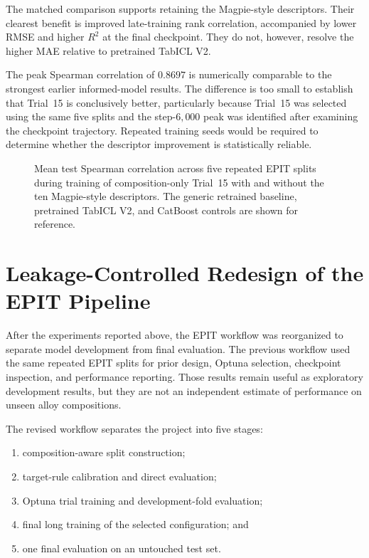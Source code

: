 \documentclass{article}
\begin{document}
The matched comparison supports retaining the Magpie-style descriptors. Their
clearest benefit is improved late-training rank correlation, accompanied by
lower RMSE and higher \(R^2\) at the final checkpoint. They do not, however,
resolve the higher MAE relative to pretrained TabICL V2.

The peak Spearman correlation of \(0.8697\) is numerically comparable to the
strongest earlier informed-model results. The difference is too small to
establish that Trial~15 is conclusively better, particularly because Trial~15
was selected using the same five splits and the step-\(6{,}000\) peak was
identified after examining the checkpoint trajectory. Repeated training seeds
would be required to determine whether the descriptor improvement is
statistically reliable.

\begin{figure}[htbp]
    \centering
    
    \caption{Mean test Spearman correlation across five repeated EPIT splits
    during training of composition-only Trial~15 with and without the ten
    Magpie-style descriptors. The generic retrained baseline, pretrained
    TabICL V2, and CatBoost controls are shown for reference.}
    \label{fig:magpie-trial15-spearman}
\end{figure}

\section{Leakage-Controlled Redesign of the EPIT Pipeline}
\label{sec:epit-pipeline-redesign}

After the experiments reported above, the EPIT workflow was reorganized to
separate model development from final evaluation. The previous workflow used
the same repeated EPIT splits for prior design, Optuna selection, checkpoint
inspection, and performance reporting. Those results remain useful as
exploratory development results, but they are not an independent estimate of
performance on unseen alloy compositions.

The revised workflow separates the project into five stages:

\begin{enumerate}
    \item composition-aware split construction;
    \item target-rule calibration and direct evaluation;
    \item Optuna trial training and development-fold evaluation;
    \item final long training of the selected configuration; and
    \item one final evaluation on an untouched test set.
\end{enumerate}
\end{document}
